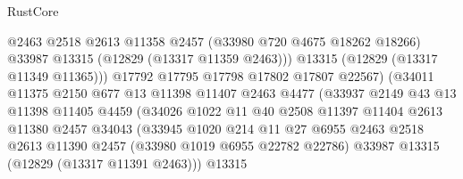 \begin{lexlean}{RustCore}
\begin{coremodule}
                                    @2463
                                    @2518
                                    @2613
                                    @11358
                                    @2457
                                    (@33980 @720 @4675 @18262 @18266)
                                    @33987
                                    @13315
                                    (@12829 (@13317 @11359 @2463)))
                                  @13315
                                  (@12829 (@13317 @11349 @11365)))
                                @17792
                                @17795
                                @17798
                                @17802
                                @17807
                                @22567)
                              (@34011
                                @11375
                                @2150
                                @677
                                @13
                                @11398
                                @11407
                                @2463
                                @4477
                                (@33937
                                  @2149
                                  @43
                                  @13
                                  @11398
                                  @11405
                                  @4459
                                  (@34026
                                    @1022
                                    @11
                                    @40
                                    @2508
                                    @11397
                                    @11404
                                    @2613
                                    @11380
                                    @2457
                                    @34043
                                    (@33945
                                      @1020
                                      @214
                                      @11
                                      @27
                                      @6955
                                      @2463
                                      @2518
                                      @2613
                                      @11390
                                      @2457
                                      (@33980 @1019 @6955 @22782 @22786)
                                      @33987
                                      @13315
                                      (@12829 (@13317 @11391 @2463)))
                                    @13315

\end{coremodule}
\end{lexlean}
